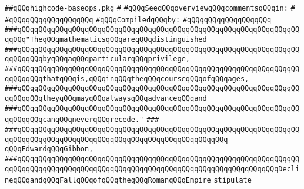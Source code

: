 \label{src/lib/compiler/back/top/highcode/highcode-baseops.pkg}
\verb|##qQQqhighcode-baseops.pkg|\newline
\verb|#|\newline
\verb|#qQQqSeeqQQqoverviewqQQqcommentsqQQqin:|\newline
\verb|#|\newline
\verb|#qQQqqQQqqQQqqQQqqQQq|\newline
\newline
\verb|#qQQqCompiledqQQqby:|\newline
\verb|#qQQqqQQqqQQqqQQqqQQq|\newline
\newline
\newline
\newline
\newline
\newline
\verb|###qQQqqQQqqQQqqQQqqQQqqQQqqQQqqQQqqQQqqQQqqQQqqQQqqQQqqQQqqQQqqQQqqQQqqQQq"TheqQQqmathematicsqQQqareqQQqdistinguished|\newline
\verb|###qQQqqQQqqQQqqQQqqQQqqQQqqQQqqQQqqQQqqQQqqQQqqQQqqQQqqQQqqQQqqQQqqQQqqQQqqQQqbyqQQqaqQQqparticularqQQqprivilege,|\newline
\verb|###qQQqqQQqqQQqqQQqqQQqqQQqqQQqqQQqqQQqqQQqqQQqqQQqqQQqqQQqqQQqqQQqqQQqqQQqqQQqthatqQQqis,qQQqinqQQqtheqQQqcourseqQQqofqQQqages,|\newline
\verb|###qQQqqQQqqQQqqQQqqQQqqQQqqQQqqQQqqQQqqQQqqQQqqQQqqQQqqQQqqQQqqQQqqQQqqQQqqQQqtheyqQQqmayqQQqalwaysqQQqadvanceqQQqand|\newline
\verb|###qQQqqQQqqQQqqQQqqQQqqQQqqQQqqQQqqQQqqQQqqQQqqQQqqQQqqQQqqQQqqQQqqQQqqQQqqQQqcanqQQqneverqQQqrecede."|\newline
\verb|###|\newline
\verb|###qQQqqQQqqQQqqQQqqQQqqQQqqQQqqQQqqQQqqQQqqQQqqQQqqQQqqQQqqQQqqQQqqQQqqQQqqQQqqQQqqQQqqQQqqQQqqQQqqQQqqQQqqQQqqQQqqQQqqQQq--qQQqEdwardqQQqGibbon,|\newline
\verb|###qQQqqQQqqQQqqQQqqQQqqQQqqQQqqQQqqQQqqQQqqQQqqQQqqQQqqQQqqQQqqQQqqQQqqQQqqQQqqQQqqQQqqQQqqQQqqQQqqQQqqQQqqQQqqQQqqQQqqQQqqQQqqQQqqQQqDeclineqQQqandqQQqFallqQQqofqQQqtheqQQqRomanqQQqEmpire|\newline
\newline
\newline
\verb|stipulate|\newline
